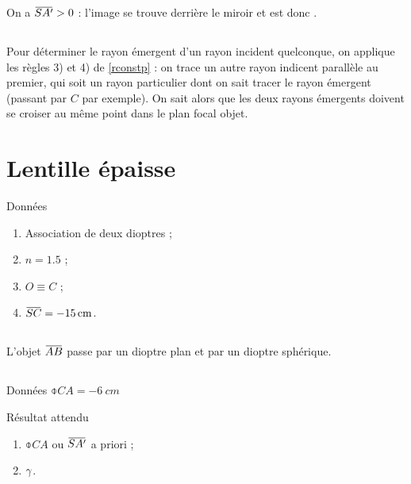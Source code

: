 \documentclass[10pt,a5paper,notitlepage]{book}
\begin{document}
\subsubsection{}
On a $\SAp > 0$ : l'image se trouve derrière le miroir et est donc
.

\subsection{}
Pour déterminer le rayon émergent d'un rayon incident quelconque, on applique
les règles 3) et 4) de \ref{rconstp} : on trace un autre rayon indicent
parallèle au premier, qui soit un rayon particulier dont on sait tracer le rayon
émergent (passant par $C$ par exemple). On sait alors que les deux rayons
émergents doivent se croiser au même point dans le plan focal objet.

\section{Lentille épaisse}
\begin{NCdefi}{Données}
    \begin{enumerate}
        \item Association de deux dioptres ;
        \item $n = 1.5$ ;
        \item $O \equiv C$ ;
        \item $\SC = \SI{-15}{cm}$.
    \end{enumerate}
\end{NCdefi}

\subsection{}
L'objet $\ABb$ passe par un dioptre plan et par un dioptre sphérique.

\subsection{}
\begin{NCdefi}{Données}
    $\obar{CA} = \SI{-6}{cm}$
\end{NCdefi}

\begin{NCprop}{Résultat attendu}
    \begin{enumerate}
        \item $\obar{CA}$ ou $\SAp$ a priori ;
        \item $\gamma$.
    \end{enumerate}
\end{NCprop}
\end{document}
